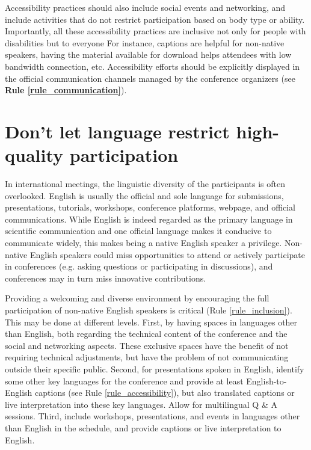 \documentclass[10pt,letterpaper]{article}
\begin{document}
Accessibility practices should also include social events and networking, and include activities that do not restrict participation based on body type or ability. Importantly, all these accessibility practices are inclusive not only for people with disabilities but to everyone %
For instance, captions are helpful for non-native speakers, having the material available for download helps attendees with low bandwidth connection, etc. Accessibility efforts should be explicitly displayed in the official communication channels managed by the conference organizers (see \textbf{Rule \ref{rule_communication}}). 




\section{Don't let language restrict high-quality participation}
\label{rule_language}

In international meetings, the linguistic diversity of the participants is often overlooked. 
English is usually the official and sole language for submissions, presentations, tutorials, workshops, conference platforms, webpage, and official communications. 
While English is indeed regarded as the primary language in scientific communication and one official language makes it conducive to communicate widely, this makes being a native English speaker a privilege.
Non-native English speakers could miss opportunities to attend or actively participate in conferences (e.g. asking questions or participating in discussions),
and conferences may in turn miss innovative contributions.

Providing a welcoming and diverse environment by encouraging the full participation of non-native English speakers is critical (Rule \ref{rule_inclusion}). This may be done at different levels. First, by having spaces in languages other than English, both regarding the technical content of the conference and the social and networking aspects. These exclusive spaces have the benefit of not requiring technical adjustments, but have the problem of not communicating outside their specific public.   
Second, for presentations spoken in English, identify some other key languages for the conference and provide at least English-to-English captions (see Rule \ref{rule_accessibility}), but also translated captions or live interpretation into these key languages. Allow for multilingual Q \& A sessions. Third, include workshops, presentations, and events in languages other than English in the schedule, and provide captions or live interpretation to English. 
\end{document}
